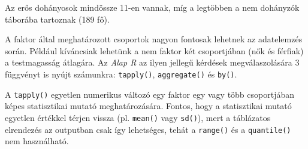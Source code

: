\documentclass[
]{book}
\newenvironment{Shaded}{\begin{snugshade}}{\end{snugshade}}
\newcommand{\AttributeTok}[1]{\textcolor[rgb]{0.77,0.63,0.00}{#1}}
\newcommand{\CommentTok}[1]{\textcolor[rgb]{0.56,0.35,0.01}{\textit{#1}}}
\newcommand{\FunctionTok}[1]{\textcolor[rgb]{0.00,0.00,0.00}{#1}}
\newcommand{\NormalTok}[1]{#1}
\newcommand{\SpecialCharTok}[1]{\textcolor[rgb]{0.00,0.00,0.00}{#1}}
\newcommand{\StringTok}[1]{\textcolor[rgb]{0.31,0.60,0.02}{#1}}
\begin{document}
\begin{Shaded}
\end{Shaded}

Az erős dohányosok mindössze 11-en vannak, míg a legtöbben a nem dohányzók táborába tartoznak (189 fő).

A faktor által meghatározott csoportok nagyon fontosak lehetnek az adatelemzés során. Például kíváncsiak lehetünk a nem faktor két csoportjában (nők és férfiak) a testmagasság átlagára. Az \emph{Alap R} az ilyen jellegű kérdések megválaszolására 3 függvényt is nyújt számunkra: \texttt{tapply()}, \texttt{aggregate()} és \texttt{by()}.

A \texttt{tapply()} egyetlen numerikus változó egy faktor egy vagy több csoportjában képes statisztikai mutató meghatározására. Fontos, hogy a statisztikai mutató egyetlen értékkel térjen vissza (pl. \texttt{mean()} vagy \texttt{sd()}), mert a táblázatos elrendezés az outputban csak így lehetséges, tehát a \texttt{range()} és a \texttt{quantile()} nem használható.
\end{document}

